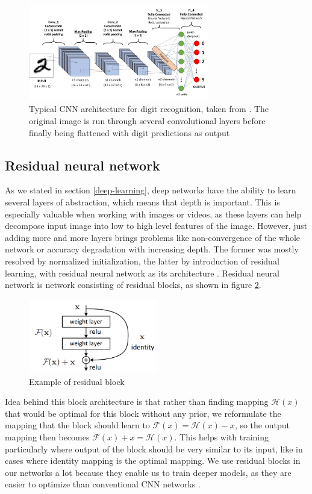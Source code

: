     \begin{figure}
        \centerline{\includegraphics[width=0.7\textwidth]{praca/images/cnn_architecture.jpeg}}
        \caption[Typical architecture CNN for digit recognition]{Typical CNN architecture for digit recognition, taken from \cite{cnn}. The original image is run through several convolutional layers before finally being flattened with digit predictions as output}
        \label{fig:cnn}
    \end{figure}
    \subsection{Residual neural network}
    As we stated in section \ref{deep-learning}, deep networks have the ability to learn several layers of abstraction, which means that depth is important. This is especially valuable when working with images or videos, as these layers can help decompose input image into low to high level features of the image. However, just adding more and more layers brings problems like non-convergence of the whole network or 
    accuracy degradation with increasing depth. The former was mostly resolved by normalized initialization, the latter by introduction of residual learning, with residual neural network as its architecture \cite{residual-network}. Residual neural network is network consisting of residual blocks, as shown in figure \ref{fig:res_block}.
    \begin{figure}
        \centerline{\includegraphics[width=0.5\textwidth]{praca/images/residual-block.png}}
        \caption[Example of residual block]{Example of residual block}
        \label{fig:res_block}
    \end{figure}
    Idea behind this block architecture is that rather than finding mapping $\mathcal{H}(x)$ that would be optimal for this block without any prior, we reformulate the mapping that the block should learn to $\mathcal{F}(x) = \mathcal{H}(x) - x$, so the output mapping then becomes $\mathcal{F}(x) + x = \mathcal{H}(x)$. This helps with training particularly where output of the block should be very similar to its input, like in cases where identity mapping is the optimal mapping. We use residual blocks in our networks a lot because they enable us to train deeper models, as they are easier to optimize than conventional CNN networks \cite{residual-network}.